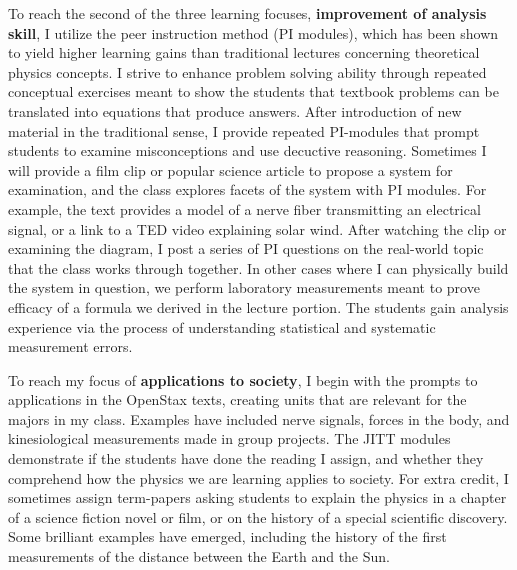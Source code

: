 \documentclass[../../../main.tex]{subfiles}
\begin{document}
To reach the second of the three learning focuses, \textbf{improvement of analysis skill}, I utilize the peer instruction method (PI modules), which has been shown to yield higher learning gains than traditional lectures concerning theoretical physics concepts.  I strive to enhance problem solving ability through repeated conceptual exercises meant to show the students that textbook problems can be translated into equations that produce answers.  After introduction of new material in the traditional sense, I provide repeated PI-modules that prompt students to examine misconceptions and use decuctive reasoning.  Sometimes I will provide a film clip or popular science article to propose a system for examination, and the class explores facets of the system with PI modules.  For example, the text provides a model of a nerve fiber transmitting an electrical signal, or a link to a TED video explaining solar wind.  After watching the clip or examining the diagram, I post a series of PI questions on the real-world topic that the class works through together. In other cases where I can physically build the system in question, we perform laboratory measurements meant to prove efficacy of a formula we derived in the lecture portion.  The students gain analysis experience via the process of understanding statistical and systematic measurement errors. \\ \hspace{0.1cm}

To reach my focus of \textbf{applications to society}, I begin with the prompts to applications in the OpenStax texts, creating units that are relevant for the majors in my class.  Examples have included nerve signals, forces in the body, and kinesiological measurements made in group projects. The JITT modules demonstrate if the students have done the reading I assign, and whether they comprehend how the physics we are learning applies to society. For extra credit, I sometimes assign term-papers asking students to explain the physics in a chapter of a science fiction novel or film, or on the history of a special scientific discovery.  Some brilliant examples have emerged, including the history of the first measurements of the distance between the Earth and the Sun. \\ \hspace{0.1cm}
\end{document}
